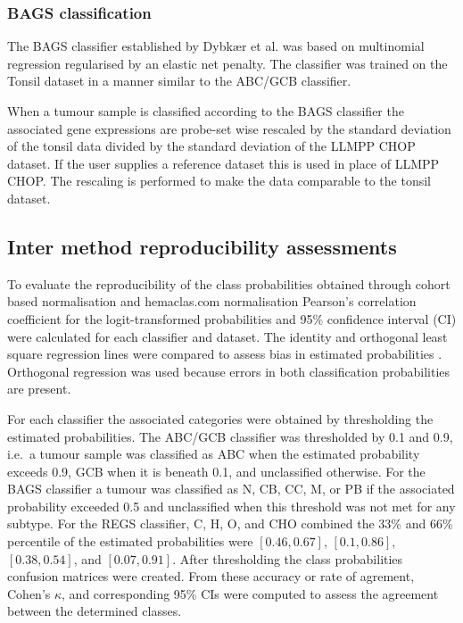 \documentclass[10pt]{bmc_article}
\newenvironment{bmcformat}{\fussy\setboolean{publ}{true}}{\fussy}
\begin{document}
\begin{bmcformat}
\subsubsection*{BAGS classification}
The BAGS classifier established by Dybk\ae r et al. \cite{Dybkaer2013} was based on multinomial regression regularised by an elastic net penalty. The classifier was trained on the Tonsil dataset in a manner similar to the ABC/GCB classifier.

When a tumour sample is classified according to the BAGS classifier the associated gene expressions are probe-set wise rescaled by the standard deviation of the tonsil data divided by the standard deviation of the LLMPP CHOP dataset. If the user supplies a reference dataset this is used in place of LLMPP CHOP. The rescaling is performed to make the data comparable to the tonsil dataset.


\subsection*{Inter method reproducibility assessments}
To evaluate the reproducibility of the class probabilities obtained through cohort based normalisation and hemaclas.com normalisation Pearson's correlation coefficient for the logit-transformed probabilities and 95\% confidence interval (CI) were calculated for each classifier and dataset. The identity and orthogonal least square regression lines were compared to assess bias in estimated probabilities \cite{CHEN1989}. Orthogonal regression was used because errors in both classification probabilities are present.

For each classifier the associated categories were obtained by thresholding the estimated probabilities. The ABC/GCB classifier was thresholded by 0.1 and 0.9, i.e.\ a tumour sample was classified as ABC when the estimated probability exceeds 0.9, GCB when it is beneath 0.1, and unclassified otherwise.  For the BAGS classifier a tumour was classified as N, CB, CC, M, or PB if the associated probability exceeded 0.5 and unclassified when this threshold was not met for any subtype. For the REGS classifier, C, H, O, and CHO combined the 33\% and 66\% percentile of the estimated probabilities were $[0.46, 0.67]$, $[0.1, 0.86]$, $[0.38, 0.54]$, and $[0.07, 0.91]$.
After thresholding the class probabilities confusion matrices were created. From these accuracy or rate of agrement, Cohen's $\kappa$, and corresponding 95\% CIs were computed to assess the agreement between the determined classes.



\end{bmcformat}
\end{document}

